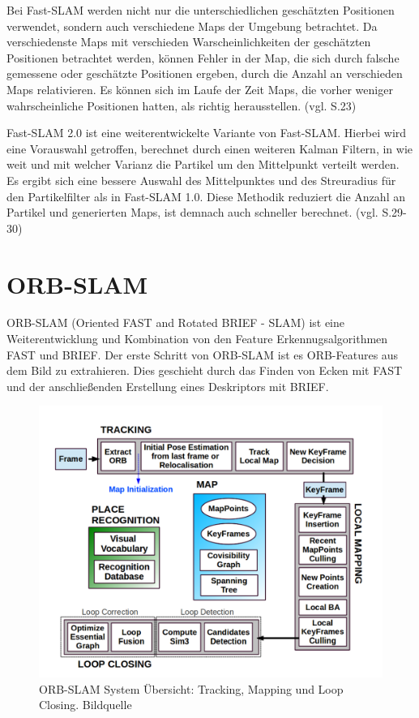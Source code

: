 Bei Fast-SLAM werden nicht nur die unterschiedlichen geschätzten Positionen verwendet, sondern auch verschiedene Maps der Umgebung betrachtet. Da verschiedenste Maps mit verschieden Warscheinlichkeiten der geschätzten Positionen betrachtet werden, können Fehler in der Map, die sich durch falsche gemessene oder geschätzte Positionen ergeben, durch die Anzahl an verschieden Maps relativieren. Es können sich im Laufe der Zeit Maps, die vorher weniger wahrscheinliche Positionen hatten, als richtig herausstellen. (vgl.  \cite{slam_studi} S.23)

Fast-SLAM 2.0 ist eine weiterentwickelte Variante von Fast-SLAM. Hierbei wird eine Vorauswahl getroffen, berechnet durch einen weiteren Kalman Filtern, in wie weit und mit welcher Varianz die Partikel um den Mittelpunkt verteilt werden. Es ergibt sich eine bessere Auswahl des Mittelpunktes und des Streuradius für den Partikelfilter als in Fast-SLAM 1.0. Diese Methodik reduziert die Anzahl an Partikel und generierten Maps, ist demnach auch schneller berechnet. (vgl. \cite{slam_studi} S.29-30)

\section{ORB-SLAM}

ORB-SLAM (Oriented FAST and Rotated BRIEF - SLAM) ist eine Weiterentwicklung und Kombination von den Feature Erkennugsalgorithmen FAST und BRIEF. Der erste Schritt von ORB-SLAM ist es ORB-Features aus dem Bild zu extrahieren. Dies geschieht durch das Finden von Ecken mit FAST und der anschließenden Erstellung eines Deskriptors mit BRIEF.

\begin{figure}[H]
	\centering
	\includegraphics[scale=0.5]{orb.png}
	\caption{ORB-SLAM System Übersicht: Tracking, Mapping und Loop Closing. Bildquelle \cite{orbslam_og}}
\end{figure} 


